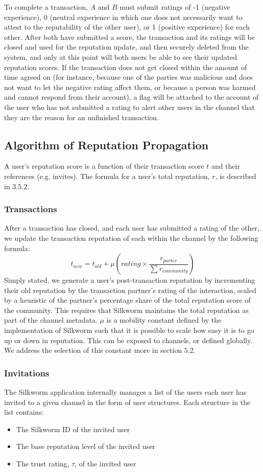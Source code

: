 \documentclass[letterpaper,twocolumn,10pt]{article}
\begin{document}
To complete a transaction, $A$ and $B$ must submit ratings of -1 (negative experience), 0 (neutral experience in which one does not necessarily want to attest to the reputability of the other user), or 1 (positive experience) for each other. After both have submitted a score, the transaction and its ratings will be closed and used for the reputation update, and then securely deleted from the system, and only at this point will both users be able to see their updated reputation scores. If the transaction does not get closed within the amount of time agreed on (for instance, because one of the parties was malicious and does not want to let the negative rating affect them, or because a person was harmed and cannot respond from their account), a flag will be attached to the account of the user who has not submitted a rating to alert other users in the channel that they are the reason for an unfinished transaction.


\subsection{Algorithm of Reputation Propagation}
A user's reputation score is a function of their transaction score $t$ and their references (e.g. invites). The formula for a user's total reputation, $r$, is described in $3.5.2$.
\subsubsection{Transactions}
After a transaction has closed, and each user has submitted a rating of the other, we update the transaction reputation of each within the channel by the following formula:
\[t_{new} = t_{old} + \mu \left( rating \times \frac{r_{parter}}{\sum r_{community}}\right)\]
Simply stated, we generate a user's post-transaction reputation by incrementing their old reputation by the transaction partner's rating of the interaction, scaled by a heuristic of the partner's percentage share of the total reputation score of the community. This requires that Silkworm maintains the total reputation as part of the channel metadata. $\mu$ is a mobility constant defined by the implementation of Silkworm such that it is possible to scale how easy it is to go up or down in reputation. This can be exposed to channels, or defined globally. We address the selection of this constant more in section $5.2$.

\subsubsection{Invitations}
The Silkworm application internally manages a list of the users each user has invited to a given channel in the form of user structures. Each structure in the list contains:
\begin{itemize}
    \item The Silkworm ID of the invited user
    \item The base reputation level of the invited user
    \item The trust rating, $\tau$, of the invited user
\end{itemize}
\end{document}
